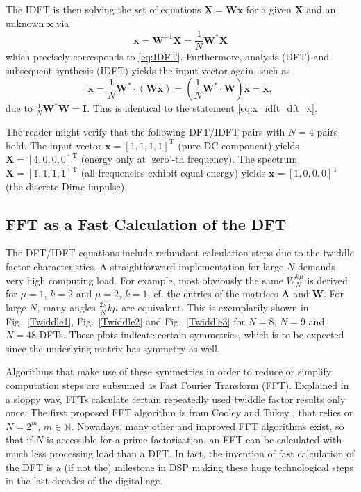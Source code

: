 \documentclass[11pt,a4paper,DIV=12]{scrartcl}
\begin{document}
The IDFT is then solving the set of equations
$\mathbf{X} = \mathbf{W} \mathbf{x}$ for a given $\mathbf{X}$ and an unknown $\mathbf{x}$
via
\begin{equation}
\mathbf{x} = \mathbf{W}^{-1} \mathbf{X} = \frac{1}{N}\mathbf{W}^* \mathbf{X}
\end{equation}
which precisely corresponds to \eqref{eq:IDFT}.
Furthermore, analysis (DFT) and subsequent synthesis (IDFT) yields the input
vector again, such as
\begin{equation}
\mathbf{x} = \frac{1}{N}\mathbf{W}^* \cdot (\mathbf{W} \mathbf{x}) =
(\frac{1}{N}\mathbf{W}^* \cdot \mathbf{W}) \mathbf{x} = \mathbf{x},
\end{equation}
due to $\frac{1}{N}\mathbf{W}^* \mathbf{W} = \mathbf{I}$.
This is identical to the statement \eqref{eq:x_idft_dft_x}.

The reader might verify that the following DFT/IDFT pairs with $N=4$ pairs hold.
%
The input vector $\mathbf{x}=[1,1,1,1]^\mathrm{T}$ (pure DC component)
yields $\mathbf{X} = [4,0,0,0]^\mathrm{T}$ (energy only at 'zero'-th frequency).
The spectrum $\mathbf{X} = [1,1,1,1]^\mathrm{T}$ (all frequencies exhibit equal
energy) yields $\mathbf{x} = [1,0,0,0]^\mathrm{T}$ (the discrete Dirac impulse).

\subsection{FFT as a Fast Calculation of the DFT}
The DFT/IDFT equations include redundant calculation steps due to the twiddle
factor characteristics.
%
A straightforward implementation for large $N$ demands very high computing load.
%
For example, most obviously the same $W_N^{k\mu}$ is derived for $\mu=1$, $k=2$
and $\mu=2$, $k=1$, cf. the entries of the matrices $\mathbf{A}$ and $\mathbf{W}$.
%
For large $N$, many angles $\frac{2\pi}{N}k\mu$ are equivalent.
%
This is exemplarily shown in Fig.~\ref{Twiddle1}, Fig.~\ref{Twiddle2} and
Fig.~\ref{Twiddle3} for $N=8$, $N=9$ and $N=48$ DFTs.
%
These plots indicate certain symmetries, which is to be expected since the
underlying matrix has symmetry as well.

Algorithms that make use of these symmetries in order to reduce or simplify
computation steps are subsumed as Fast Fourier Transform (FFT).
%
Explained in a sloppy way, FFTs calculate certain repeatedly used twiddle factor
results only once.
%
The first proposed FFT algorithm is from Cooley and Tukey \cite{Cooley1965},
that relies on $N=2^m$, $m\in\mathbb{N}$.
%
Nowadays, many other and improved FFT algorithms exist, so that if $N$
is accessible for a prime factorisation, an FFT can be calculated with much less
processing load than a DFT.
%
In fact, the invention of fast calculation of the DFT is a (if not the)
milestone in DSP making these huge technological steps in the last decades of the
digital age.
\end{document}
